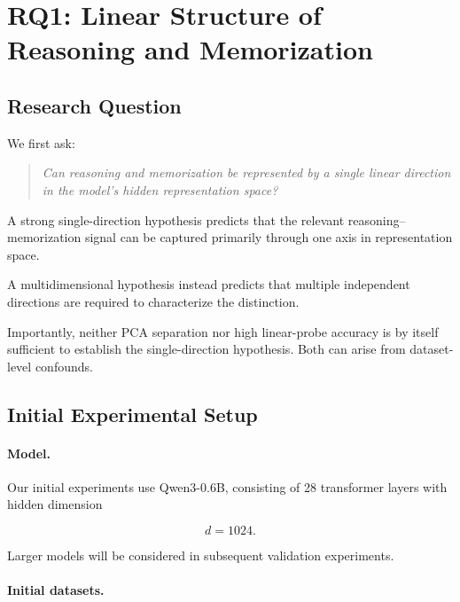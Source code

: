 \documentclass[11pt]{article}
\begin{document}

\section{RQ1: Linear Structure of Reasoning and Memorization}

\subsection{Research Question}

We first ask:

\begin{quote}
\textit{Can reasoning and memorization be represented by a single
linear direction in the model's hidden representation space?}
\end{quote}

A strong single-direction hypothesis predicts that the relevant
reasoning--memorization signal can be captured primarily through one
axis in representation space.

A multidimensional hypothesis instead predicts that multiple
independent directions are required to characterize the distinction.

Importantly, neither PCA separation nor high linear-probe accuracy is
by itself sufficient to establish the single-direction hypothesis.
Both can arise from dataset-level confounds.


\subsection{Initial Experimental Setup}

\paragraph{Model.}

Our initial experiments use Qwen3-0.6B, consisting of 28 transformer
layers with hidden dimension

\[
d = 1024.
\]

Larger models will be considered in subsequent validation experiments.

\paragraph{Initial datasets.}
\end{document}
